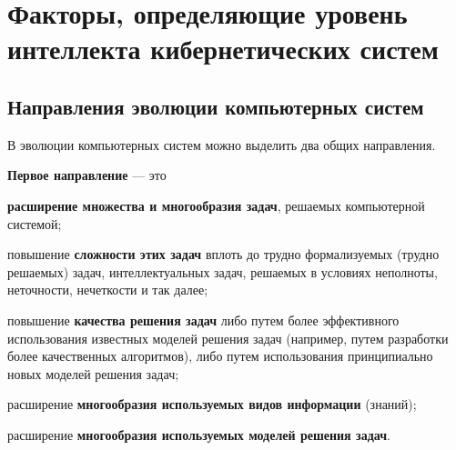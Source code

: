 \chapter{Факторы, определяющие уровень интеллекта кибернетических систем}
{\label{chap_intro}}

\vspace{-7\baselineskip}

\begin{SCn}


\end{SCn}




\section{Направления эволюции компьютерных систем}
\label{sec_directions_evolution_computer_systems}

\begin{SCn}
\end{SCn}

В эволюции компьютерных систем можно выделить два общих направления.

\textbf{Первое направление} --- это 
\begin{textitemize}
	\item \textbf{расширение множества и многообразия задач}, решаемых компьютерной системой; 
	\item повышение \textbf{сложности этих задач} вплоть до трудно формализуемых (трудно решаемых) задач, интеллектуальных задач, решаемых в условиях неполноты, неточности, нечеткости и так далее;
	\item повышение \textbf{качества решения задач} либо путем более эффективного использования известных моделей решения задач (например, путем разработки более качественных алгоритмов), либо путем использования принципиально новых моделей решения задач;
	\item расширение \textbf{многообразия используемых видов информации} (знаний);
	\item расширение \textbf{многообразия используемых моделей решения задач}.
\end{textitemize}

